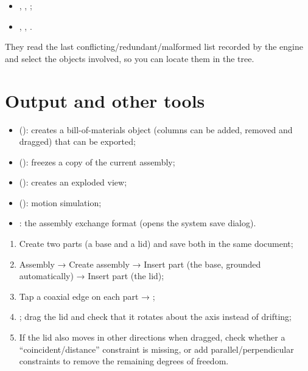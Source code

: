 \begin{itemize}
  \item {}, ,
        ;
  \item {}, , .
\end{itemize}

They read the last conflicting/redundant/malformed list recorded by the engine and select the objects
involved, so you can locate them in the tree.

\section{Output and other tools}

\begin{itemize}
  \item {} (): creates a bill-of-materials object (columns can be added,
        removed and dragged) that can be exported;
  \item {} (): freezes a copy of the current assembly;
  \item {} (): creates an exploded view;
  \item {} (): motion simulation;
  \item {}: the assembly exchange format (opens the system save dialog).
\end{itemize}

\begin{practice}
\begin{enumerate}
  \item Create two parts (a base and a lid) and save both in the same document;
  \item Assembly → Create assembly → Insert part (the base, grounded automatically) → Insert part (the lid);
  \item Tap a coaxial edge on each part → ;
  \item {}; drag the lid and check that it rotates about the axis instead of drifting;
  \item If the lid also moves in other directions when dragged, check whether a ``coincident/distance''
        constraint is missing, or add parallel/perpendicular constraints to remove the remaining degrees of
        freedom.
\end{enumerate}
\end{practice}


